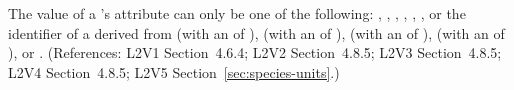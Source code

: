 The value of a \Species's  attribute can only be one of
the following: , , , ,
, , or the identifier of a
\UnitDefinition derived from  (with an  of
),  (with an  of ), 
(with an  of ),  (with an
 of ), or .  (References: L2V1
Section~4.6.4; L2V2 Section~4.8.5; L2V3 Section~4.8.5; L2V4 Section~4.8.5; L2V5 Section~\ref{sec:species-units}.)
